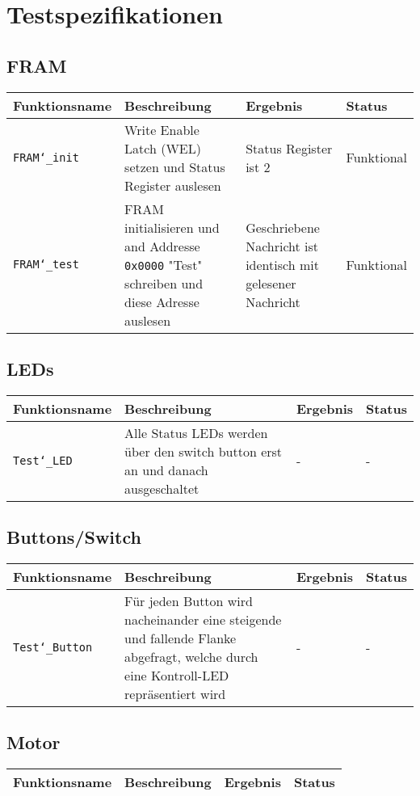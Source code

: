 \documentclass{article}
\begin{document}
	\section{Testspezifikationen}
	\subsection{FRAM}
		\begin{tabular}{|p{3.2cm}|p{5.5cm}|p{4cm}| p{1.6cm} |}
			\hline
				\textbf{Funktionsname} & \textbf{Beschreibung} & \textbf{Ergebnis} & \textbf{Status} \\
			\hline
				\texttt{FRAM\char`_init} & Write Enable Latch (WEL) setzen und Status Register auslesen & Status Register ist 2 & Funktional \\
			\hline
				\texttt{FRAM\char`_test} & FRAM initialisieren und and Addresse \texttt{0x0000} "Test" schreiben und diese Adresse auslesen & Geschriebene Nachricht ist identisch mit gelesener Nachricht & Funktional\\
			\hline
		\end{tabular}
	\subsection{LEDs}
		\begin{tabular}{|p{3.2cm}|p{5.5cm}|p{4cm}| p{1.6cm} |}
			\hline
				\textbf{Funktionsname} & \textbf{Beschreibung} & \textbf{Ergebnis} & \textbf{Status} \\
			\hline
				 \texttt{Test\char`_LED} & Alle Status LEDs werden über den switch button erst an und danach ausgeschaltet & - & - \\
			\hline
		\end{tabular}
		\subsection{Buttons/Switch}
	\begin{tabular}{|p{3.2cm}|p{5.5cm}|p{4cm}| p{1.6cm} |}
		\hline
			\textbf{Funktionsname} & \textbf{Beschreibung} & \textbf{Ergebnis} & \textbf{Status} \\
		\hline
			 \texttt{Test\char`_Button} & Für jeden Button wird nacheinander eine steigende und fallende Flanke abgefragt, welche durch eine Kontroll-LED repräsentiert wird & - & - \\
		\hline
	\end{tabular}
	\subsection{Motor}
		\begin{tabular}{|p{3.2cm}|p{5.5cm}|p{4cm}| p{1.6cm} |}
			\hline
				\textbf{Funktionsname} & \textbf{Beschreibung} & \textbf{Ergebnis} & \textbf{Status} \\
			\hline
		\end{tabular}
\end{document}

